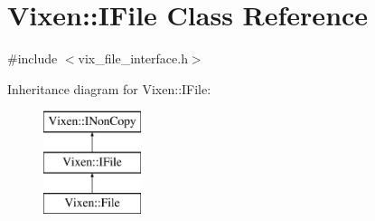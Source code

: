 \hypertarget{classVixen_1_1IFile}{}\section{Vixen\+:\+:I\+File Class Reference}
\label{classVixen_1_1IFile}


{\ttfamily \#include $<$vix\+\_\+file\+\_\+interface.\+h$>$}

Inheritance diagram for Vixen\+:\+:I\+File\+:\begin{figure}[H]
\begin{center}
\leavevmode
\includegraphics[height=3.000000cm]{classVixen_1_1IFile}
\end{center}
\end{figure}
